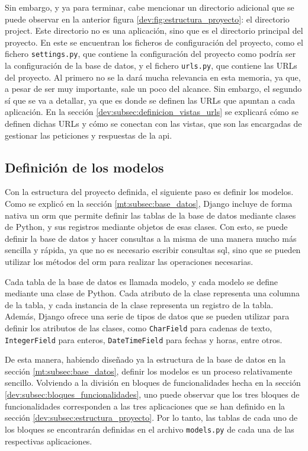 Sin embargo, y ya para terminar, cabe mencionar un directorio adicional que se puede observar en la anterior figura \ref{dev:fig:estructura_proyecto}: el directorio project. Este directorio no es una aplicación, sino que es el directorio principal del proyecto. En este se encuentran los ficheros de configuración del proyecto, como el fichero \texttt{settings.py}, que contiene la configuración del proyecto como podría ser la configuración de la base de datos, y el fichero \texttt{urls.py}, que contiene las URLs del proyecto. Al primero no se la dará mucha relevancia en esta memoria, ya que, a pesar de ser muy importante, sale un poco del alcance. Sin embargo, el segundo sí que se va a detallar, ya que es donde se definen las URLs que apuntan a cada aplicación. En la sección \ref{dev:subsec:definicion_vistas_urls} se explicará cómo se definen dichas URLs y cómo se conectan con las vistas, que son las encargadas de gestionar las peticiones y respuestas de la \gls{api}.

\subsection{Definición de los modelos}
\label{dev:subsec:definicion_modelos}

Con la estructura del proyecto definida, el siguiente paso es definir los modelos. Como se explicó en la sección \ref{mt:subsec:base_datos}, Django incluye de forma nativa un \gls{orm} que permite definir las tablas de la base de datos mediante clases de Python, y sus registros mediante objetos de esas clases. Con esto, se puede definir la base de datos y hacer consultas a la misma de una manera mucho más sencilla y rápida, ya que no es necesario escribir consultas \gls{sql}, sino que se pueden utilizar los métodos del \gls{orm} para realizar las operaciones necesarias.

Cada tabla de la base de datos es llamada modelo, y cada modelo se define mediante una clase de Python. Cada atributo de la clase representa una columna de la tabla, y cada instancia de la clase representa un registro de la tabla. Además, Django ofrece una serie de tipos de datos que se pueden utilizar para definir los atributos de las clases, como \texttt{CharField} para cadenas de texto, \texttt{IntegerField} para enteros, \texttt{DateTimeField} para fechas y horas, entre otros.

De esta manera, habiendo diseñado ya la estructura de la base de datos en la sección \ref{mt:subsec:base_datos}, definir los modelos es un proceso relativamente sencillo. Volviendo a la división en bloques de funcionalidades hecha en la sección \ref{dev:subsec:bloques_funcionalidades}, uno puede observar que los tres bloques de funcionalidades corresponden a las tres aplicaciones que se han definido en la sección \ref{dev:subsec:estructura_proyecto}. Por lo tanto, las tablas de cada uno de los bloques se encontrarán definidas en el archivo \texttt{models.py} de cada una de las respectivas aplicaciones.

